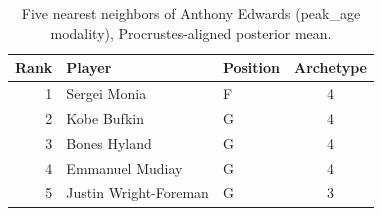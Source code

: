 \begin{table}[htbp]
  \centering\small
  \begin{tabular}{rllc}
    \toprule
    Rank & Player & Position & Archetype \\
    \midrule
    1 & Sergei Monia & F & 4 \\
    2 & Kobe Bufkin & G & 4 \\
    3 & Bones Hyland & G & 4 \\
    4 & Emmanuel Mudiay & G & 4 \\
    5 & Justin Wright-Foreman & G & 3 \\
    \bottomrule
  \end{tabular}
  \caption{Five nearest neighbors of Anthony Edwards (peak_age modality), Procrustes-aligned posterior mean.}
  \label{tab:Anthony_Edwards_neighbors_peak_age}
\end{table}

